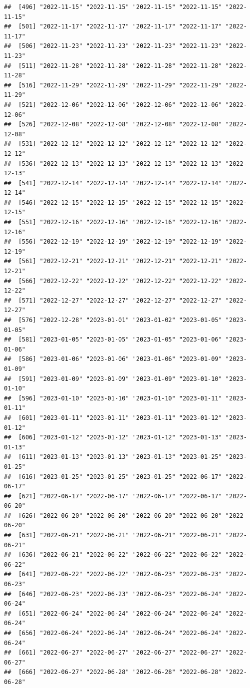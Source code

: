 \documentclass[
]{article}
\begin{document}
\begin{verbatim}
##  [496] "2022-11-15" "2022-11-15" "2022-11-15" "2022-11-15" "2022-11-15"
##  [501] "2022-11-17" "2022-11-17" "2022-11-17" "2022-11-17" "2022-11-17"
##  [506] "2022-11-23" "2022-11-23" "2022-11-23" "2022-11-23" "2022-11-23"
##  [511] "2022-11-28" "2022-11-28" "2022-11-28" "2022-11-28" "2022-11-28"
##  [516] "2022-11-29" "2022-11-29" "2022-11-29" "2022-11-29" "2022-11-29"
##  [521] "2022-12-06" "2022-12-06" "2022-12-06" "2022-12-06" "2022-12-06"
##  [526] "2022-12-08" "2022-12-08" "2022-12-08" "2022-12-08" "2022-12-08"
##  [531] "2022-12-12" "2022-12-12" "2022-12-12" "2022-12-12" "2022-12-12"
##  [536] "2022-12-13" "2022-12-13" "2022-12-13" "2022-12-13" "2022-12-13"
##  [541] "2022-12-14" "2022-12-14" "2022-12-14" "2022-12-14" "2022-12-14"
##  [546] "2022-12-15" "2022-12-15" "2022-12-15" "2022-12-15" "2022-12-15"
##  [551] "2022-12-16" "2022-12-16" "2022-12-16" "2022-12-16" "2022-12-16"
##  [556] "2022-12-19" "2022-12-19" "2022-12-19" "2022-12-19" "2022-12-19"
##  [561] "2022-12-21" "2022-12-21" "2022-12-21" "2022-12-21" "2022-12-21"
##  [566] "2022-12-22" "2022-12-22" "2022-12-22" "2022-12-22" "2022-12-22"
##  [571] "2022-12-27" "2022-12-27" "2022-12-27" "2022-12-27" "2022-12-27"
##  [576] "2022-12-28" "2023-01-01" "2023-01-02" "2023-01-05" "2023-01-05"
##  [581] "2023-01-05" "2023-01-05" "2023-01-05" "2023-01-06" "2023-01-06"
##  [586] "2023-01-06" "2023-01-06" "2023-01-06" "2023-01-09" "2023-01-09"
##  [591] "2023-01-09" "2023-01-09" "2023-01-09" "2023-01-10" "2023-01-10"
##  [596] "2023-01-10" "2023-01-10" "2023-01-10" "2023-01-11" "2023-01-11"
##  [601] "2023-01-11" "2023-01-11" "2023-01-11" "2023-01-12" "2023-01-12"
##  [606] "2023-01-12" "2023-01-12" "2023-01-12" "2023-01-13" "2023-01-13"
##  [611] "2023-01-13" "2023-01-13" "2023-01-13" "2023-01-25" "2023-01-25"
##  [616] "2023-01-25" "2023-01-25" "2023-01-25" "2022-06-17" "2022-06-17"
##  [621] "2022-06-17" "2022-06-17" "2022-06-17" "2022-06-17" "2022-06-20"
##  [626] "2022-06-20" "2022-06-20" "2022-06-20" "2022-06-20" "2022-06-20"
##  [631] "2022-06-21" "2022-06-21" "2022-06-21" "2022-06-21" "2022-06-21"
##  [636] "2022-06-21" "2022-06-22" "2022-06-22" "2022-06-22" "2022-06-22"
##  [641] "2022-06-22" "2022-06-22" "2022-06-23" "2022-06-23" "2022-06-23"
##  [646] "2022-06-23" "2022-06-23" "2022-06-23" "2022-06-24" "2022-06-24"
##  [651] "2022-06-24" "2022-06-24" "2022-06-24" "2022-06-24" "2022-06-24"
##  [656] "2022-06-24" "2022-06-24" "2022-06-24" "2022-06-24" "2022-06-24"
##  [661] "2022-06-27" "2022-06-27" "2022-06-27" "2022-06-27" "2022-06-27"
##  [666] "2022-06-27" "2022-06-28" "2022-06-28" "2022-06-28" "2022-06-28"

\end{verbatim}
\end{document}

